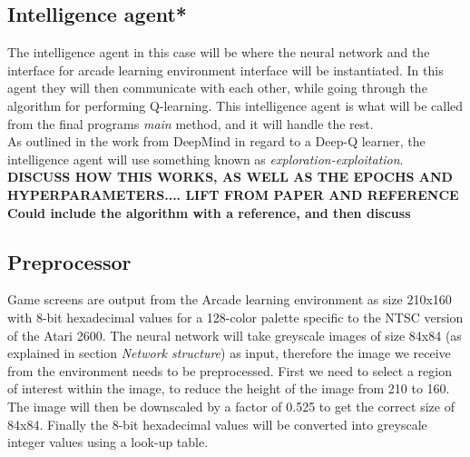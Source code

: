\documentclass[10pt]{article}
\begin{document}
	\bigskip	
	
	\subsection{Intelligence agent*}
	
		The intelligence agent in this case will be where the neural network and the interface for arcade learning environment interface will be instantiated. In this agent they will then communicate with each other, while going through the algorithm for performing Q-learning. This intelligence agent is what will be called from the final programs \textit{main} method, and it will handle the rest.\\
		
		As outlined in the work from DeepMind in regard to a Deep-Q learner, the intelligence agent will use something known as \textit{exploration-exploitation}. \textbf{DISCUSS HOW THIS WORKS, AS WELL AS THE EPOCHS AND HYPERPARAMETERS.... LIFT FROM PAPER AND REFERENCE}\\
		
		\textbf{Could include the algorithm with a reference, and then discuss}
	
	\bigskip
	
	\subsection{Preprocessor}
		Game screens are output from the Arcade learning environment as size 210x160 with 8-bit hexadecimal values for a 128-color palette specific to the NTSC version of the Atari 2600. The neural network will take greyscale images of size 84x84 (as explained in section \textit{Network structure}) as input, therefore the image we receive from the environment needs to be preprocessed. First we need to select a region of interest within the image, to reduce the height of the image from 210 to 160. The image will then be downscaled by a factor of 0.525 to get the correct size of 84x84. Finally the 8-bit hexadecimal values will be converted into greyscale integer values using a look-up table.
	
	\bigskip
	
\end{document}
